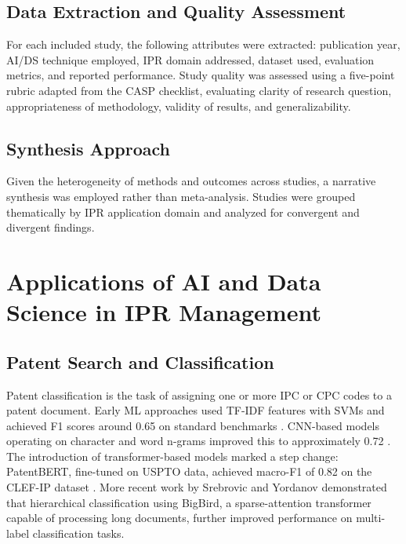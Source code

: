 \documentclass[conference]{IEEEtran}
\begin{document}
\subsection{Data Extraction and Quality Assessment}

For each included study, the following attributes were extracted: publication year, AI/DS technique employed, IPR domain addressed, dataset used, evaluation metrics, and reported performance. Study quality was assessed using a five-point rubric adapted from the CASP checklist, evaluating clarity of research question, appropriateness of methodology, validity of results, and generalizability.

\subsection{Synthesis Approach}

Given the heterogeneity of methods and outcomes across studies, a narrative synthesis was employed rather than meta-analysis. Studies were grouped thematically by IPR application domain and analyzed for convergent and divergent findings.

\section{Applications of AI and Data Science in IPR Management}

\subsection{Patent Search and Classification}

Patent classification is the task of assigning one or more IPC or CPC codes to a patent document. Early ML approaches used TF-IDF features with SVMs and achieved F1 scores around 0.65 on standard benchmarks \cite{ref14}. CNN-based models operating on character and word n-grams improved this to approximately 0.72 \cite{ref16}. The introduction of transformer-based models marked a step change: PatentBERT, fine-tuned on USPTO data, achieved macro-F1 of 0.82 on the CLEF-IP dataset \cite{ref7}. More recent work by Srebrovic and Yordanov \cite{ref22} demonstrated that hierarchical classification using BigBird, a sparse-attention transformer capable of processing long documents, further improved performance on multi-label classification tasks.
\end{document}
